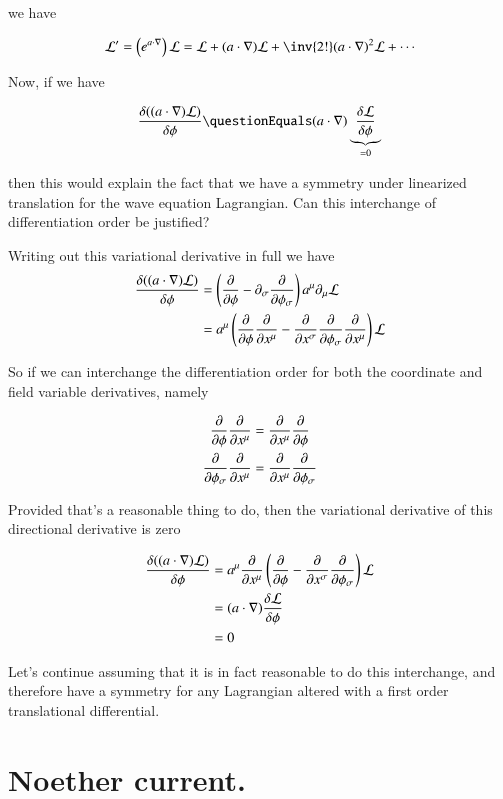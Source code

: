 \documentclass{article}
\begin{document}
we have

\begin{align*}
\LL' = \left( e^{a \cdot \grad}\right) \LL = \LL + (a \cdot \grad)\LL + \inv{2!}(a \cdot \grad)^2 \LL + \cdots
\end{align*}

Now, if we have

\begin{align*}
\frac{\delta ((a \cdot \grad) \LL)}{\delta \phi} 
&
\questionEquals
(a \cdot \grad) \underbrace{\frac{\delta \LL}{\delta \phi}}_{=0} \\
\end{align*}

then this would explain the fact that we have a symmetry under linearized translation for the wave equation Lagrangian.  Can this interchange
of differentiation order be justified?

Writing out this variational derivative in full we have
\begin{align*}
\frac{\delta ((a \cdot \nabla) \mathcal{L})}{\delta \phi} 
&=
\left( \frac{\partial {}}{\partial {\phi}} - \partial_\sigma \frac{\partial {}}{\partial {\phi_\sigma}} \right) a^\mu \partial_\mu \mathcal{L} \\
&=
a^\mu \left( 
\frac{\partial {}}{\partial {\phi}} \frac{\partial {}}{\partial {x^\mu}} 
 - \frac{\partial {}}{\partial {x^\sigma}} \frac{\partial {}}{\partial {\phi_\sigma}} \frac{\partial {}}{\partial {x^\mu}} 
\right) 
\mathcal{L} \\
\end{align*}

So if we can interchange the differentiation order for both the coordinate and field variable derivatives, namely

\begin{align*}
\frac{\partial {}}{\partial {\phi}} \frac{\partial {}}{\partial {x^\mu}} &= \frac{\partial {}}{\partial {x^\mu}} \frac{\partial {}}{\partial {\phi}} \\
\frac{\partial {}}{\partial {\phi_\sigma}} \frac{\partial {}}{\partial {x^\mu}}  &= \frac{\partial {}}{\partial {x^\mu}} \frac{\partial {}}{\partial {\phi_\sigma}}
\end{align*}

Provided that's a reasonable thing to do, then the variational derivative of this directional derivative is zero 

\begin{align*}
\frac{\delta ((a \cdot \nabla) \mathcal{L})}{\delta \phi} 
&=
a^\mu \frac{\partial {}}{\partial {x^\mu}} 
\left( 
\frac{\partial {}}{\partial {\phi}} 
 - \frac{\partial {}}{\partial {x^\sigma}} \frac{\partial {}}{\partial {\phi_\sigma}} 
\right) 
\mathcal{L} \\
&=
(a \cdot \nabla) \frac{\delta \mathcal{L}}{\delta \phi} \\
&= 0
\end{align*}

Let's continue assuming that it is in fact reasonable to do this interchange, and therefore have a symmetry for any Lagrangian 
altered with a first order translational differential.

\section{ Noether current. }



\end{document}
